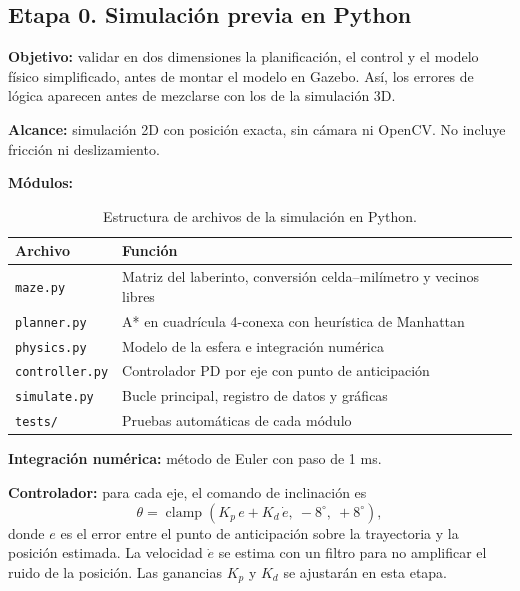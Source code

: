 \documentclass[11pt,a4paper]{article}
\begin{document}
\subsection{Etapa 0. Simulación previa en Python}
\textbf{Objetivo:} validar en dos dimensiones la planificación, el control y el modelo físico simplificado, antes de montar el modelo en Gazebo. Así, los errores de lógica aparecen antes de mezclarse con los de la simulación 3D.

\textbf{Alcance:} simulación 2D con posición exacta, sin cámara ni OpenCV. No incluye fricción ni deslizamiento.

\textbf{Módulos:}
\begin{table}[H]
    \centering
    \begin{tabular}{@{}ll@{}}
        \toprule
        \textbf{Archivo} & \textbf{Función} \\
        \midrule
        \texttt{maze.py} & Matriz del laberinto, conversión celda--milímetro y vecinos libres \\
        \texttt{planner.py} & A* en cuadrícula 4-conexa con heurística de Manhattan \\
        \texttt{physics.py} & Modelo de la esfera e integración numérica \\
        \texttt{controller.py} & Controlador PD por eje con punto de anticipación \\
        \texttt{simulate.py} & Bucle principal, registro de datos y gráficas \\
        \texttt{tests/} & Pruebas automáticas de cada módulo \\
        \bottomrule
    \end{tabular}
    \caption{Estructura de archivos de la simulación en Python.}
\end{table}

\textbf{Integración numérica:} método de Euler con paso de 1 ms.

\textbf{Controlador:} para cada eje, el comando de inclinación es
\begin{equation}
    \theta = \operatorname{clamp}\left(K_p\, e + K_d\, \dot{e},\ -8^\circ,\ +8^\circ\right),
\end{equation}
donde $e$ es el error entre el punto de anticipación sobre la trayectoria y la posición estimada. La velocidad $\dot{e}$ se estima con un filtro para no amplificar el ruido de la posición. Las ganancias $K_p$ y $K_d$ se ajustarán en esta etapa.
\end{document}
